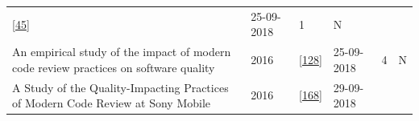 \documentclass[]{book}
\begin{document}
\begin{longtable}[]{@{}llllll@{}}
\begin{minipage}[t]{0.13\columnwidth}
{[}\protect\hyperlink{ref-cohen2010modern}{45}{]}\strut
\end{minipage} & \begin{minipage}[t]{0.06\columnwidth}\raggedright\strut
25-09-2018\strut
\end{minipage} & \begin{minipage}[t]{0.07\columnwidth}\raggedright\strut
1\strut
\end{minipage} & \begin{minipage}[t]{0.08\columnwidth}\raggedright\strut
N\strut
\end{minipage}\tabularnewline
\begin{minipage}[t]{0.47\columnwidth}\raggedright\strut
An empirical study of the impact of modern code review practices on
software quality\strut
\end{minipage} & \begin{minipage}[t]{0.03\columnwidth}\raggedright\strut
2016\strut
\end{minipage} & \begin{minipage}[t]{0.13\columnwidth}\raggedright\strut
{[}\protect\hyperlink{ref-mcintosh2016empirical}{128}{]}\strut
\end{minipage} & \begin{minipage}[t]{0.06\columnwidth}\raggedright\strut
25-09-2018\strut
\end{minipage} & \begin{minipage}[t]{0.07\columnwidth}\raggedright\strut
4\strut
\end{minipage} & \begin{minipage}[t]{0.08\columnwidth}\raggedright\strut
N\strut
\end{minipage}\tabularnewline
\begin{minipage}[t]{0.47\columnwidth}\raggedright\strut
A Study of the Quality-Impacting Practices of Modern Code Review at Sony
Mobile\strut
\end{minipage} & \begin{minipage}[t]{0.03\columnwidth}\raggedright\strut
2016\strut
\end{minipage} & \begin{minipage}[t]{0.13\columnwidth}\raggedright\strut
{[}\protect\hyperlink{ref-shimagaki2016study}{168}{]}\strut
\end{minipage} & \begin{minipage}[t]{0.06\columnwidth}\raggedright\strut
29-09-2018\strut
\end{minipage} & \begin{minipage}[t]{0.07\columnwidth}\raggedright\strut

\end{minipage}
\end{longtable}
\end{document}

